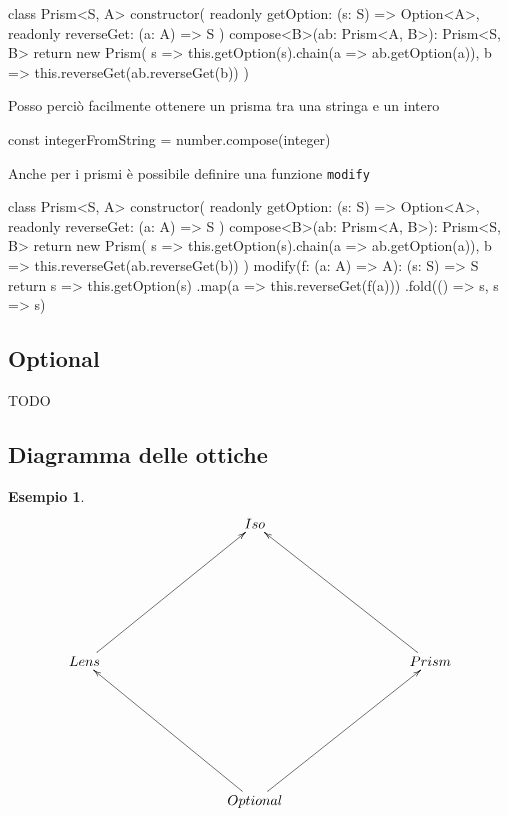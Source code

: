 \documentclass[12pt]{article}
\theoremstyle{definition}
\newtheorem{example}{Esempio}[section]
\newenvironment{code}
  {\vspace{0.5cm} \VerbatimEnvironment\begin{typescriptcode}}
  {\end{typescriptcode} \vspace{0.2cm}}
\begin{document}
\begin{code}
class Prism<S, A> {
  constructor(
    readonly getOption: (s: S) => Option<A>,
    readonly reverseGet: (a: A) => S
  ) {}
  compose<B>(ab: Prism<A, B>): Prism<S, B> {
    return new Prism(
      s => this.getOption(s).chain(a => ab.getOption(a)),
      b => this.reverseGet(ab.reverseGet(b))
    )
  }
}
\end{code}

Posso perciò facilmente ottenere un prisma tra una stringa e un intero

\begin{code}
const integerFromString = number.compose(integer)
\end{code}

Anche per i prismi è possibile definire una funzione \texttt{modify}

\begin{code}
class Prism<S, A> {
  constructor(
    readonly getOption: (s: S) => Option<A>,
    readonly reverseGet: (a: A) => S
  ) {}
  compose<B>(ab: Prism<A, B>): Prism<S, B> {
    return new Prism(
      s => this.getOption(s).chain(a => ab.getOption(a)),
      b => this.reverseGet(ab.reverseGet(b))
    )
  }
  modify(f: (a: A) => A): (s: S) => S {
    return s =>
      this.getOption(s)
        .map(a => this.reverseGet(f(a)))
        .fold(() => s, s => s)
  }
}
\end{code}

\subsection{Optional}

TODO

\subsection{Diagramma delle ottiche}

\begin{example}
\[
\xymatrixrowsep{3cm}
\xymatrixcolsep{3cm}
\xymatrix{
  & Iso \\
  Lens \ar[ur] & & Prism \ar[ul] \\
  & Optional \ar[ul] \ar[ur] \\
}
\]
\end{example}
\end{document}
